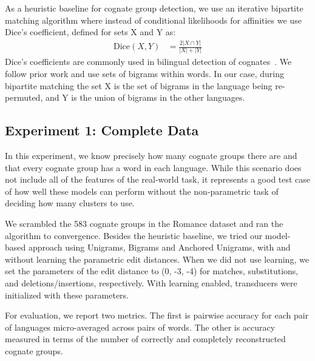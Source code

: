 \documentclass[11pt,a4paper]{article}
\begin{document}
As a heuristic baseline for cognate group detection, we use an iterative
bipartite matching algorithm where instead of conditional likelihoods
for affinities we use Dice's coefficient, defined for sets X and
Y as:
\begin{equation}
  \begin{split}
    \mathrm{Dice}(X,Y) &= \frac{2 |X\cap Y|}{|X| + |Y|}
   \end{split}
 \end{equation}
Dice's coefficients are commonly used in bilingual detection of
cognates~\cite{Kondrak01identifyingcognates,Kondrak03cognatescan}. We
follow prior work and use sets of bigrams within words. In our case,
during bipartite matching the set X is the set of bigrams in the
language being re-permuted, and Y is the union of bigrams in the other languages.

\subsection{Experiment 1: Complete Data}

In this experiment, we know precisely how many cognate groups there
are and that every cognate group has a word in each language. While
this scenario does not include all of the features of the real-world
task, it represents a good test case of how well these models can
perform without the non-parametric task of deciding how many clusters
to use.

We scrambled the 583 cognate groups in the Romance dataset and ran
the algorithm to convergence. Besides the heuristic baseline, we
tried our model-based approach using Unigrams, Bigrams and Anchored
Unigrams, with and without learning the parametric edit distances.
When we did not use learning, we set the parameters of the edit
distance to (0, -3, -4) for matches, substitutions, and
deletions/insertions, respectively. With learning enabled, transducers
were initialized with these parameters.

For evaluation, we report two metrics. The first is pairwise accuracy
for each pair of languages micro-averaged across pairs of words.
The other is accuracy measured in terms of the number of correctly
and completely reconstructed cognate groups.
\end{document}
